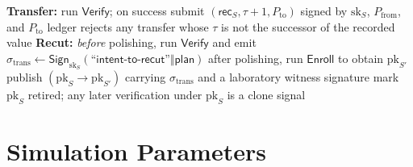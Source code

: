 \documentclass[10pt,twocolumn]{article}
\theoremstyle{remark}
\newcommand{\Sign}{\textsf{Sign}}
\begin{document}
\begin{algorithm}[H]
\caption{$\textsf{Transfer}(S, P_{\mathrm{from}}, P_{\mathrm{to}})$ and $\textsf{Recut}(S)$}
\begin{algorithmic}[1]
\State \textbf{Transfer:} run $\textsf{Verify}$; on success submit
       $(\mathsf{rec}_S, \tau{+}1, P_{\mathrm{to}})$ signed by $\mathrm{sk}_S$,
       $P_{\mathrm{from}}$, and $P_{\mathrm{to}}$
\State ledger rejects any transfer whose $\tau$ is not the successor of the recorded value
\Statex
\State \textbf{Recut:} \emph{before} polishing, run $\textsf{Verify}$ and emit
       $\sigma_{\mathrm{trans}} \gets \Sign_{\mathrm{sk}_S}(\textsf{``intent-to-recut''} \Vert \mathsf{plan})$
\State after polishing, run $\textsf{Enroll}$ to obtain $\mathrm{pk}_{S'}$
\State publish $(\mathrm{pk}_S \to \mathrm{pk}_{S'})$ carrying $\sigma_{\mathrm{trans}}$ and a laboratory witness signature
\State mark $\mathrm{pk}_S$ retired; any later verification under $\mathrm{pk}_S$ is a clone signal
\end{algorithmic}
\end{algorithm}

\section{Simulation Parameters}
\end{document}
